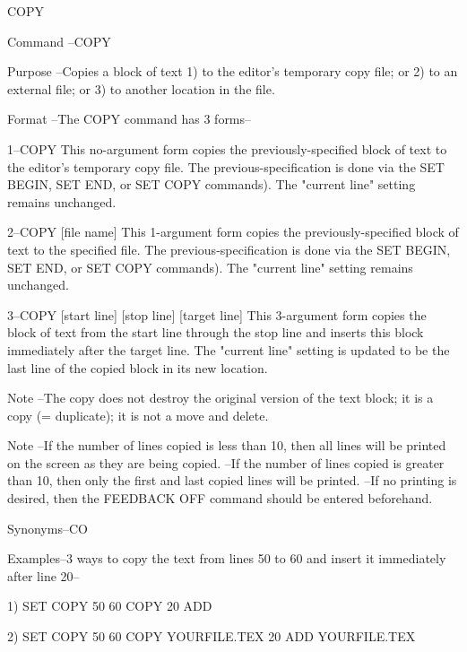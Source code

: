 COPY
 
Command --COPY
 
Purpose --Copies a block of text
             1) to the editor's temporary copy file; or
             2) to an external file; or
             3) to another location in the file.
 
Format  --The COPY command has 3 forms--
 
       1--COPY
          This no-argument form copies the
          previously-specified block of text
          to the editor's temporary copy file.
          The previous-specification is done via the
          SET BEGIN, SET END, or SET COPY  commands).
          The "current line" setting remains unchanged.
 
       2--COPY    [file name]
          This 1-argument form copies the
          previously-specified block of text
          to the specified file.
          The previous-specification is done via the
          SET BEGIN, SET END, or SET COPY  commands).
          The "current line" setting remains unchanged.
 
       3--COPY   [start line]   [stop line]   [target line]
          This 3-argument form copies the block of text
          from the    start line   through the    stop line
          and inserts this block immediately after
          the    target line.
          The "current line" setting is updated to be
          the last line of the copied block in its
          new location.
 
Note    --The copy does not destroy the original version
          of the text block; it is a copy (= duplicate);
          it is not a move and delete.
 
Note    --If the number of lines copied is
          less than 10, then all lines
          will be printed on the screen
          as they are being copied.
        --If the number of lines copied
          is greater than 10, then only the
          first and last copied lines will
          be printed.
        --If no printing is desired, then
          the FEEDBACK OFF command should
          be entered beforehand.
 
Synonyms--CO
 
Examples--3 ways to copy the text from
          lines 50 to 60 and insert it
          immediately after line 20--
 
          1) SET COPY  50 60
             COPY
             20
             ADD
 
          2) SET COPY  50 60
             COPY YOURFILE.TEX
             20
             ADD YOURFILE.TEX
 
